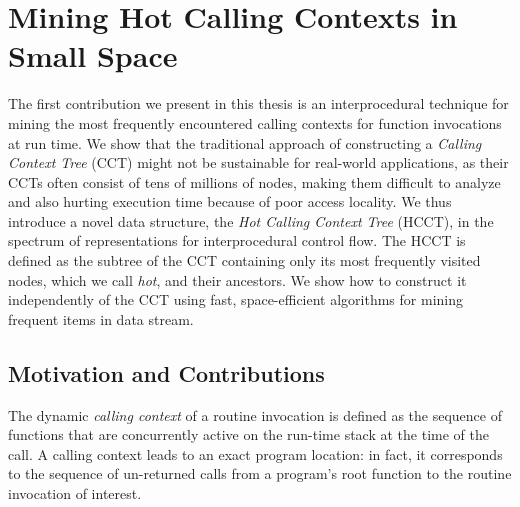 \section{Mining Hot Calling Contexts in Small Space}


The first contribution we present in this thesis is an interprocedural technique for mining the most frequently encountered calling contexts for function invocations at run time. We show that the traditional approach of constructing a {\em Calling Context Tree} (CCT) might not be sustainable for real-world applications, as their CCTs often consist of tens of millions of nodes, making them difficult to analyze and also hurting execution time because of poor access locality. We thus introduce a novel data structure, the {\em Hot Calling Context Tree} (HCCT), in the spectrum of representations for interprocedural control flow. The HCCT is defined as the subtree of the CCT containing only its most frequently visited nodes, which we call {\em hot}, and their ancestors. We show how to construct it independently of the CCT using fast, space-efficient algorithms for mining frequent items in data stream.

\subsection{Motivation and Contributions}
The dynamic {\em calling context} of a routine invocation is defined as the sequence of functions that are concurrently active on the run-time stack  at the time of the call. A calling context leads to an exact program location: in fact, it corresponds to the sequence of un-returned calls from a program’s root function to the routine invocation of interest.

